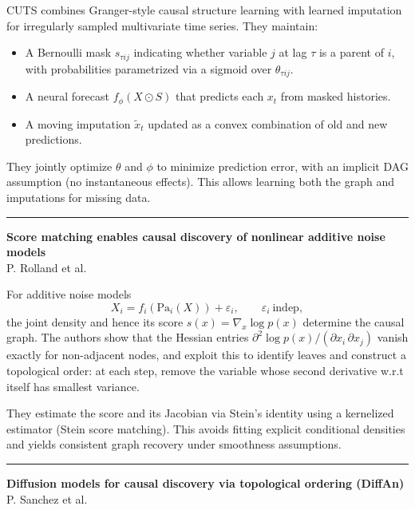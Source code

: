 \documentclass[a5paper]{article}
\let\epsilon\varepsilon
\providecommand{\tightlist}{%
  \setlength{\itemsep}{0pt}\setlength{\parskip}{0pt}}
\begin{document}
CUTS combines Granger-style causal structure learning with learned
imputation for irregularly sampled multivariate time series. They
maintain:

\begin{itemize}
\tightlist
\item
  A Bernoulli mask $s_{\tau ij}$ indicating whether variable $j$ at lag $\tau$
  is a parent of $i$, with probabilities parametrized via a sigmoid over
  $\theta_{\tau ij}$.
\item
  A neural forecast $f_\phi(X\odot S)$ that predicts each $x_t$ from masked
  histories.
\item
  A moving imputation $\tilde x_t$ updated as a convex combination of
  old and new predictions.
\end{itemize}

They jointly optimize $\theta$ and $\phi$ to minimize prediction error, with an
implicit DAG assumption (no instantaneous effects). This allows learning
both the graph and imputations for missing data.

\begin{center}\rule{0.5\linewidth}{0.5pt}\end{center}

\textbf{Score matching enables causal discovery of nonlinear additive
noise models}\\
P. Rolland et al.

For additive noise models
\[ X_i = f_i(\mathrm{Pa}_i(X)) +
\epsilon_i,\qquad \epsilon_i~\text{indep}, \]
the joint density and hence its score $s(x) = \nabla_x \log p(x)$ determine the
causal graph. The authors show that the Hessian entries
$\partial^2 \log p(x) / (\partial x_i\,\partial x_j)$
vanish exactly for non-adjacent nodes, and exploit this to
identify leaves and construct a topological order: at each step, remove
the variable whose second derivative w.r.t itself has smallest variance.

They estimate the score and its Jacobian via Stein's identity using a
kernelized estimator (Stein score matching). This avoids fitting
explicit conditional densities and yields consistent graph recovery
under smoothness assumptions.

\begin{center}\rule{0.5\linewidth}{0.5pt}\end{center}

\textbf{Diffusion models for causal discovery via topological ordering
(DiffAn)}\\
P. Sanchez et al.
\end{document}
